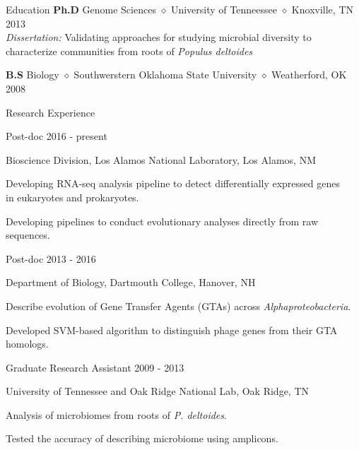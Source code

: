 \documentclass{resume} %
\begin{document}

\begin{rSection}{Education}
{\bf Ph.D} Genome Sciences {$\diamond$} University of Tenneessee {$\diamond$} Knoxville, TN \hfill {2013} \\
\textit{Dissertation:} Validating approaches for studying microbial diversity to \\
characterize communities from roots of \textit{Populus deltoides}


{\bf B.S}  Biology {$\diamond$} Southwerstern Oklahoma State University {$\diamond$}  Weatherford, OK \hfill{2008}
\end{rSection}

\begin{rSection}{Research Experience}
\begin{rSubsection}{Post-doc} {2016 - present}{}{}
\item Bioscience Division, Los Alamos National Laboratory, Los Alamos, NM
\item Developing RNA-seq analysis pipeline to detect differentially expressed genes \\
in eukaryotes and prokaryotes.
\item Developing pipelines to conduct evolutionary analyses directly from raw sequences.
\end{rSubsection}

\begin{rSubsection}{Post-doc} {2013 - 2016}{}{}
\item Department of Biology, Dartmouth College, Hanover, NH
\item Describe evolution of Gene Transfer Agents (GTAs) across \textit{Alphaproteobacteria}.
\item Developed SVM-based algorithm to distinguish phage genes from their GTA homologs.
\end{rSubsection}

\begin{rSubsection}{Graduate Research Assistant} {2009 - 2013}{}{}
\item University of Tennessee and Oak Ridge National Lab, Oak Ridge, TN 
\item Analysis of microbiomes from roots of \textit{P. deltoides}.
\item Tested the accuracy of describing microbiome using amplicons.
\end{rSubsection}
\end{rSection}
\end{document}

